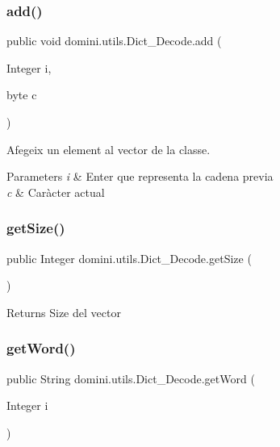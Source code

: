\subsubsection{\texorpdfstring{add()}{add()}}
{\footnotesize\ttfamily public void domini.\+utils.\+Dict\+\_\+\+Decode.\+add (\begin{DoxyParamCaption}\item[{Integer}]{i,  }\item[{byte}]{c }\end{DoxyParamCaption})\hspace{0.3cm}{\ttfamily [inline]}}



Afegeix un element al vector de la classe. 


\begin{DoxyParams}{Parameters}
{\em i} & Enter que representa la cadena previa \\
\hline
{\em c} & Caràcter actual \\
\hline
\end{DoxyParams}
\mbox{\label{classdomini_1_1utils_1_1Dict__Decode_aac69020c3515649e8c2d70e2908e3f3e}} 
\subsubsection{\texorpdfstring{get\+Size()}{getSize()}}
{\footnotesize\ttfamily public Integer domini.\+utils.\+Dict\+\_\+\+Decode.\+get\+Size (\begin{DoxyParamCaption}{ }\end{DoxyParamCaption})\hspace{0.3cm}{\ttfamily [inline]}}

\begin{DoxyReturn}{Returns}
Size del vector 
\end{DoxyReturn}
\mbox{\label{classdomini_1_1utils_1_1Dict__Decode_a0f6457460aefe9df50f0cad48f58feee}} 
\subsubsection{\texorpdfstring{get\+Word()}{getWord()}}
{\footnotesize\ttfamily public String domini.\+utils.\+Dict\+\_\+\+Decode.\+get\+Word (\begin{DoxyParamCaption}\item[{Integer}]{i }\end{DoxyParamCaption})\hspace{0.3cm}{\ttfamily [inline]}}



